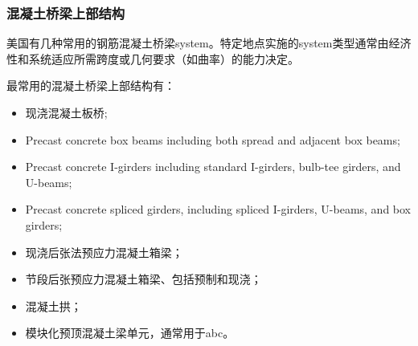 \subsubsection{混凝土桥梁上部结构}

美国有几种常用的钢筋混凝土桥梁\gls*{system}。特定地点实施的\gls*{system}类型通常由经济性和系统适应所需跨度或几何要求（如曲率）的能力决定。

最常用的混凝土桥梁上部结构有：

\begin{itemize}
  \item 现浇混凝土板桥;
  \item Precast concrete box beams including both spread and adjacent box beams;
  \item Precast concrete I-girders including standard I-girders, bulb-tee girders, and U-beams;
  \item Precast concrete spliced girders, including spliced I-girders, U-beams, and box girders;
  \item 现浇后张法预应力混凝土箱梁；
  \item 节段后张预应力混凝土箱梁、包括预制和现浇；
  \item 混凝土拱；
  \item 模块化预顶混凝土梁单元，通常用于\acrlong*{abc}。
\end{itemize}

